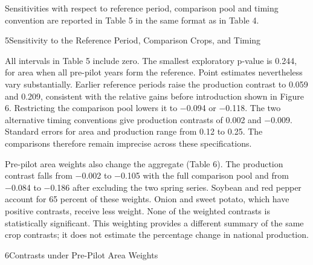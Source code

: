 
Sensitivities with respect to reference period, comparison pool and timing convention are reported in Table 5 in the same format as in Table 4.

\begin{wordtable}{5}{Sensitivity to the Reference Period, Comparison Crops, and Timing}

\end{wordtable}

All intervals in Table 5 include zero. The smallest exploratory p-value is 0.244, for area when all pre-pilot years form the reference. Point estimates nevertheless vary substantially. Earlier reference periods raise the production contrast to 0.059 and 0.209, consistent with the relative gains before introduction shown in Figure 6. Restricting the comparison pool lowers it to −0.094 or −0.118. The two alternative timing conventions give production contrasts of 0.002 and −0.009. Standard errors for area and production range from 0.12 to 0.25. The comparisons therefore remain imprecise across these specifications.

Pre-pilot area weights also change the aggregate (Table 6). The production contrast falls from −0.002 to −0.105 with the full comparison pool and from −0.084 to −0.186 after excluding the two spring series. Soybean and red pepper account for 65 percent of these weights. Onion and sweet potato, which have positive contrasts, receive less weight. None of the weighted contrasts is statistically significant. This weighting provides a different summary of the same crop contrasts; it does not estimate the percentage change in national production.

\begin{wordtable}{6}{Contrasts under Pre-Pilot Area Weights}

\end{wordtable}

